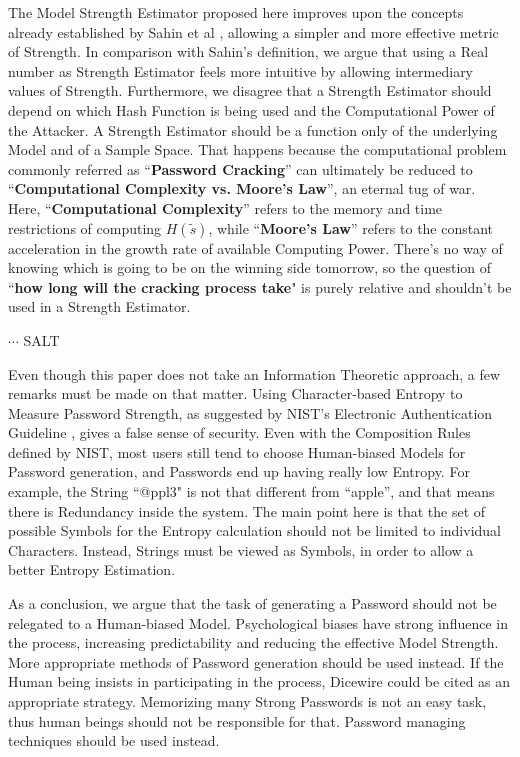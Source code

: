 \documentclass{article}
\begin{document}
The Model Strength Estimator proposed here improves upon the concepts already established by Sahin et al \cite{?}, allowing a simpler and more effective metric of Strength. 
In comparison with Sahin's definition, we argue that using a Real number as Strength Estimator feels more intuitive by allowing intermediary values of Strength. Furthermore, we disagree that a Strength Estimator should depend on which Hash Function is being used and the Computational Power of the Attacker. A Strength Estimator should be a function only of the underlying Model and of a Sample Space. That happens because the computational problem commonly referred as ``\textbf{Password Cracking}'' can ultimately be reduced to  ``\textbf{Computational Complexity vs. Moore's Law}'', an eternal tug of war. Here, ``\textbf{Computational Complexity}'' refers to the memory and time restrictions of computing $H(\tilde s)$, while ``\textbf{Moore's Law}'' refers to the constant acceleration in the growth rate of available Computing Power. There's no way of knowing which is going to be on the winning side tomorrow, so the question of ``\textbf{how long will the cracking process take}" is purely relative and shouldn't be used in a Strength Estimator.

$\cdots$
SALT

Even though this paper does not take an Information Theoretic approach, a few remarks must be made on that matter. Using Character-based Entropy to Measure Password Strength, as suggested by NIST's Electronic Authentication Guideline \cite{?}, gives a false sense of security. Even with the Composition Rules defined by NIST, most users still tend to choose Human-biased Models for Password generation, and Passwords end up having really low Entropy. For example, the String ``@ppl3" is not that different from ``apple'', and that means there is Redundancy inside the system. The main point here is that the set of possible Symbols for the Entropy calculation should not be limited to individual Characters. Instead, Strings must be viewed as Symbols, in order to allow a better Entropy Estimation.

As a conclusion, we argue that the task of generating a Password should not be relegated to a Human-biased Model. Psychological biases have strong influence in the process, increasing predictability and reducing the effective Model Strength. More appropriate methods of Password generation should be used instead. If the Human being insists in participating in the process, Dicewire \cite{?} could be cited as an appropriate strategy. Memorizing many Strong Passwords is not an easy task, thus human beings should not be responsible for that. Password managing techniques should be used instead.
\end{document}
